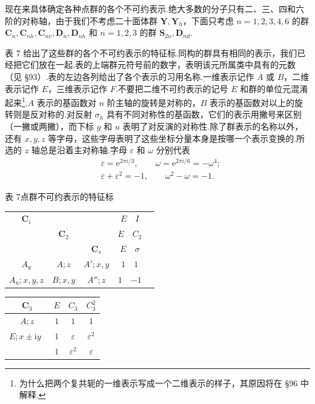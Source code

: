 现在来具体确定各种点群的各个不可约表示.绝大多数的分子只有二、三、四和六阶的对称轴，由于我们不考虑二十面体群 $\boldsymbol{Y},\boldsymbol{Y}_h$，下面只考虑 $n=1,2,3,4,6$ 的群 $\boldsymbol{C}_n,\boldsymbol{C}_{nh},\boldsymbol{C}_{nv},\boldsymbol{D}_n,\boldsymbol{D}_{nh}$ 和 $n=1,2,3$ 的群 $\boldsymbol{S}_{2n},\boldsymbol{D}_{nd}$.

表 7 给出了这些群的各个不可约表示的特征标.同构的群具有相同的表示，我们已经把它们放在一起.表的上端群元符号前的数字，表明该元所属类中具有的元数（见 §93）.表的左边各列给出了各个表示的习用名称.一维表示记作 $A$ 或 $B$，二维表示记作 $E$，三维表示记作 $F$.不要把二维不可约表示的记号 $E$ 和群的单位元混淆起来\footnote{为什么把两个复共轭的一维表示写成一个二维表示的样子，其原因将在 §96 中解释.}.$A$ 表示的基函数对 $n$ 阶主轴的旋转是对称的，$B$ 表示的基函数对以上的旋转则是反对称的.对反射 $\sigma_h$ 具有不同对称性的基函数，它们的表示用撇号来区别（一撇或两撇），而下标 $g$ 和 $u$ 表明了对反演的对称性.除了群表示的名称以外，还有 $x,y,z$ 等字母，这些字母表明了这些坐标分量本身是按哪一个表示变换的.所选的 $z$ 轴总是沿着主对称轴.字母 $\varepsilon$ 和 $\omega$ 分别代表
\begin{equation*}
\begin{aligned}
  &\varepsilon=\mathrm{e}^{2\pi i/3},\qquad
   \omega=\mathrm{e}^{2\pi i/6}=-\omega^4;\\
  &\varepsilon+\varepsilon^2=-1,\qquad
   \omega^2-\omega=-1.
\end{aligned}
\end{equation*}

\begin{center}
{\heiti 表 7}\quad 点群不可约表示的特征标
\end{center}

\begin{center}
\renewcommand{\arraystretch}{1.3}%
\begin{tabular}{ccc|cc}
  $\boldsymbol{C}_i$ & & & $E$\ \ $I$\\
  & $\boldsymbol{C}_2$ & & $E$\ \ $C_2$\\
  & & $\boldsymbol{C}_s$ & $E$\ \ $\sigma$\\
  \hline
  $A_g$ & $A;z$ & $A';x,y$ & $1$\ \ $1$\\
  $A_u;x,y,z$ & $B;x,y$ & $A'';z$ & $1$\ \ $-1$\\
\end{tabular}
\qquad
\begin{tabular}{c|ccc}
  $\boldsymbol{C}_3$ & $E$ & $C_3$ & $C_3^2$\\
  \hline
  $A;z$ & $1$ & $1$ & $1$\\
  $E;x\pm\mathrm{i}y$\ \smash{\raisebox{0.45em}{$\Bigg\}$}}
  & $1$ & $\varepsilon$ & $\varepsilon^2$\\
  & $1$ & $\varepsilon^2$ & $\varepsilon$\\
\end{tabular}
\end{center}

